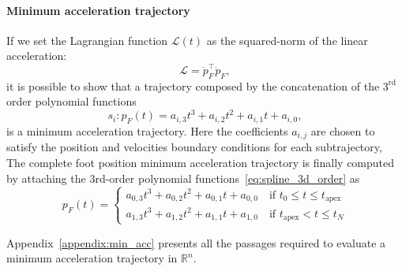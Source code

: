 \paragraph{Minimum acceleration trajectory}
If we set the Lagrangian function $\mathcal{L}(t)$ as the squared-norm of the linear acceleration:
\begin{equation}
    \mathcal{L} = \ddot{p}_F^\top \ddot{p}_F,
\end{equation}
it is possible to show that a trajectory composed by the concatenation of the $3^\text{rd}$ order polynomial functions
\begin{equation}
    \label{eq:spline_3d_order}
    s_i: p_F (t) =  a _{i, 3} t ^ 3 + a _ {i,2} t ^ 2 + a _ {i,1} t + a _ {i,0},
\end{equation}
is a minimum acceleration trajectory. Here the coefficients $a_{i,j}$ are chosen to satisfy the position and velocities boundary conditions for each subtrajectory,
The complete foot position minimum acceleration trajectory is finally computed by attaching the 3rd-order polynomial functions~\eqref{eq:spline_3d_order} as 
\begin{equation}
    p_F (t) = \begin{cases}
      a _{0, 3} t ^ 3 + a _ {0,2} t ^ 2 + a _ {0,1} t + a _ {0,0} \quad  \text{if } t_0 \le t \le t_\text{apex} \\
      a _{1, 3} t ^ 3 + a _ {1,2} t ^ 2 + a _ {1,1} t + a _ {1,0} \quad  \text{if }  t_\text{apex} < t \le t_N
    \end{cases}
\end{equation}
\par
Appendix~\ref{appendix:min_acc} presents all the passages required to evaluate a minimum acceleration trajectory in $\mathbb{R}^n$.
